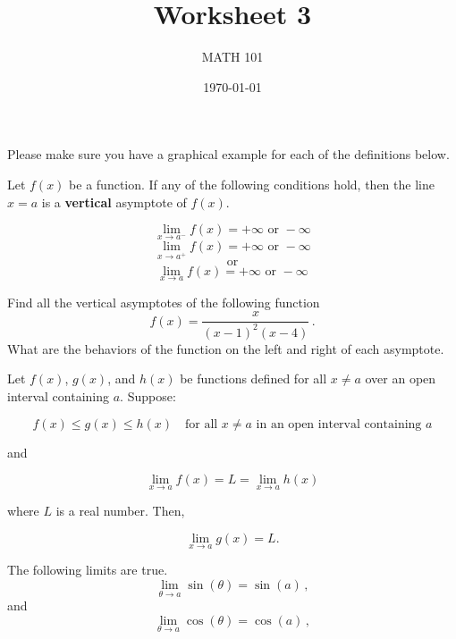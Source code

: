 \documentclass[12pt]{amsart}
\title{ Worksheet 3 }
\author{MATH 101}
\date{\today}
\begin{document}
\maketitle

Please make sure you have a graphical example for each of the definitions below.

\begin{definition}
	Let \( f(x) \) be a function. If any of the following conditions hold, then the line \( x = a \) is a \textbf{vertical} asymptote of \( f(x) \).

	\[
		\lim_{x \to a^-} f(x) = +\infty \text{ or } -\infty
	\]
	\[
		\lim_{x \to a^+} f(x) = +\infty \text{ or } -\infty
	\]
	\[
		\text{or}
	\]
	\[
		\lim_{x \to a} f(x) = +\infty \text{ or } -\infty
	\]
\end{definition}


\begin{question}
	Find all the vertical asymptotes of the following function
	\begin{equation*}
		f(x) = \frac{x}{(x-1)^2 (x-4)} \,.
	\end{equation*}
	What are the behaviors  of the function on the left and right of each asymptote.
\end{question}
\vspace{5cm}


\begin{theorem}
	Let \( f(x) \), \( g(x) \), and \( h(x) \) be functions defined for all \( x \neq a \) over an open interval containing \( a \). Suppose:

	\[
		f(x) \leq g(x) \leq h(x) \quad \text{for all } x \neq a \text{ in an open interval containing } a
	\]

	and

	\[
		\lim_{x \to a} f(x) = L = \lim_{x \to a} h(x)
	\]

	where \( L \) is a real number. Then,

	\[
		\lim_{x \to a} g(x) = L.
	\]
\end{theorem}

\begin{theorem}
	The following limits are true.
	\begin{equation*}
		\lim_{\theta \to a} \sin(\theta) = \sin(a) \,,
	\end{equation*}
	and
	\begin{equation*}
		\lim_{\theta \to a} \cos(\theta) = \cos(a) \,,
	\end{equation*}
\end{theorem}
\newpage
\end{document}
